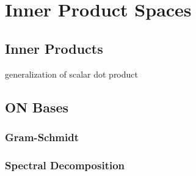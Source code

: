 \chapter{Inner Product Spaces}
\section{Inner Products}
generalization of scalar dot product
\section{ON Bases}
\subsection{Gram-Schmidt}
\subsection{Spectral Decomposition}

